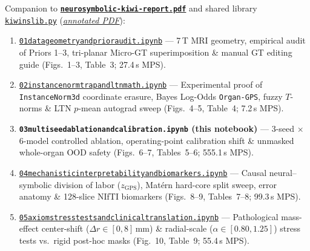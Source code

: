 \documentclass[10pt,a4paper]{article}
\renewcommand{\_}{\origunderscore\allowbreak}
\newcommand{\ghblob}{https://github.com/arvidl/BMED365-2027/blob/main}
\newcommand{\repodir}{Lab4-Comp-Imag/Kiwi-challenge/docs/neurosymbolic-report}
\begin{document}
\begin{seqbox}
{\footnotesize Companion to \href{\ghblob/\repodir/neurosymbolic-kiwi-report.pdf}{\textbf{\texttt{neurosymbolic-kiwi-report.pdf}}} and shared library \href{\ghblob/\repodir/notebooks/kiwi_ns_lib.py}{\texttt{kiwi\_ns\_lib.py}} (\href{\ghblob/\repodir/notebooks/kiwi_ns_lib_py.pdf}{\textit{annotated PDF}}):}
\begin{enumerate}[start=1, itemsep=1.2pt, topsep=2pt, font=\footnotesize]
    \item \href{\ghblob/\repodir/notebooks/01_data_geometry_and_prior_audit.ipynb}{\texttt{01\_data\_geometry\_and\_prior\_audit.ipynb}} --- 7\,T MRI geometry, empirical audit of Priors 1--3, tri-planar Micro-GT superimposition \& manual GT editing guide (Figs.\ 1--3, Table~3; 27.4\,s MPS).
    \item \href{\ghblob/\repodir/notebooks/02_instancenorm_trap_and_ltn_math.ipynb}{\texttt{02\_instancenorm\_trap\_and\_ltn\_math.ipynb}} --- Experimental proof of \texttt{InstanceNorm3d} coordinate erasure, Bayes Log-Odds \texttt{Organ-GPS}, fuzzy $T$-norms \& LTN $p$-mean autograd sweep (Figs.\ 4--5, Table~4; 7.2\,s MPS).
    \item \textbf{\texttt{03\_multiseed\_ablation\_and\_calibration.ipynb} (this notebook)} --- 3-seed $\times$ 6-model controlled ablation, operating-point calibration shift \& unmasked whole-organ OOD safety (Figs.\ 6--7, Tables~5--6; 555.1\,s MPS).
    \item \href{\ghblob/\repodir/notebooks/04_mechanistic_interpretability_and_biomarkers.ipynb}{\texttt{04\_mechanistic\_interpretability\_and\_biomarkers.ipynb}} --- Causal neural--symbolic division of labor ($z_{\text{GPS}}$), Mat\'ern hard-core split sweep, error anatomy \& 128-slice NIfTI biomarkers (Figs.\ 8--9, Tables~7--8; 99.3\,s MPS).
    \item \href{\ghblob/\repodir/notebooks/05_axiom_stress_tests_and_clinical_translation.ipynb}{\texttt{05\_axiom\_stress\_tests\_and\_clinical\_translation.ipynb}} --- Pathological mass-effect center-shift ($\Delta r \in [0, 8]$\,mm) \& radial-scale ($\alpha \in [0.80, 1.25]$) stress tests vs.\ rigid post-hoc masks (Fig.\ 10, Table~9; 55.4\,s MPS).
\end{enumerate}
\end{seqbox}
\end{document}
